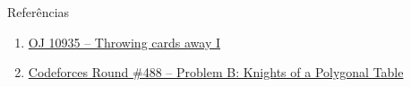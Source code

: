 \begin{frame}[fragile]{Referências}

    \begin{enumerate}
        \item \href{https://onlinejudge.org/index.php?option=com_onlinejudge&Itemid=8&category=24&page=show_problem&problem=1876}{OJ 10935 -- Throwing cards away I}

        \item \href{https://codeforces.com/problemset/problem/994/B}{Codeforces Round \#488 -- Problem B: Knights of a Polygonal Table}

    \end{enumerate}

\end{frame}
